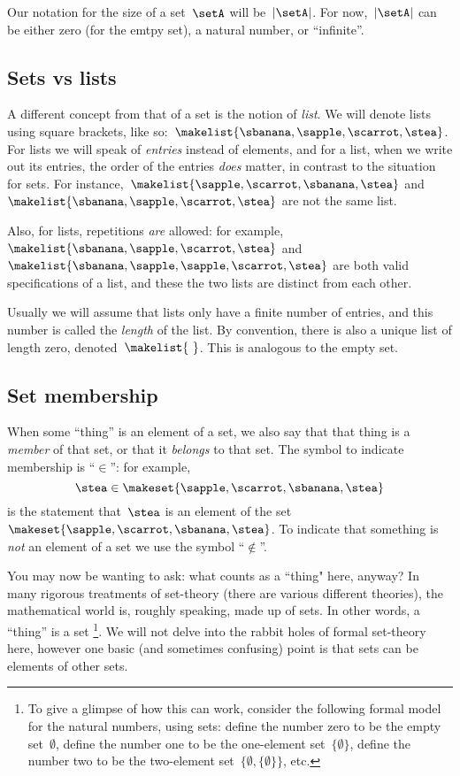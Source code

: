 Our notation for the size of a set~$\setA$ will be~$\vert \setA \vert$.
For now,~$\vert \setA \vert$ can be either zero (for the emtpy set), a natural number, or ``infinite''.
 
\subsection{Sets vs lists}

A different concept from that of a set is the notion of \emph{list}.
We will denote lists using square brackets, like so:~$\makelist{\sbanana, \sapple, \scarrot, \stea}$.
For lists we will speak of \emph{entries} instead of elements, and for a list, when we write out its entries, the order of the entries \emph{does} matter, in contrast to the situation for sets.
For instance,~$\makelist{\sapple, \scarrot, \sbanana, \stea}$ and~$\makelist{\sbanana, \sapple, \scarrot, \stea}$ are not the same list.

Also, for lists, repetitions \emph{are} allowed: for example,~$\makelist{\sbanana, \sapple, \scarrot, \stea}$ and~$\makelist{\sbanana, \sapple, \sapple, \scarrot, \stea}$ are both valid specifications of a list, and these the two lists are distinct from each other.

Usually we will assume that lists only have a finite number of entries, and this number is called the \emph{length} of the list.
By convention, there is also a unique list of length zero, denoted~$\makelist{\ }$.
This is analogous to the empty set.
 
\subsection{Set membership}

When some ``thing'' is an element of a set, we also say that that thing is a \emph{member} of that set, or that it \emph{belongs} to that set.
The symbol to indicate membership is ``$\in$'': for example,
\begin{equation*}
    \stea \in \makeset{ \sapple, \scarrot, \sbanana, \stea }
\end{equation*}
is the statement that~$\stea$ is an element of the set~$\makeset{ \sapple, \scarrot, \sbanana, \stea }$.
To indicate that something is \emph{not} an element of a set we use the symbol ``$\notin$''.

You may now be wanting to ask: what counts as a ``thing" here, anyway?
In many rigorous treatments of set-theory (there are various different theories), the mathematical world is, roughly speaking, made up of sets.
In other words, a ``thing'' is a set
\footnote{To give a glimpse of how this can work, consider the following formal model for the natural numbers, using sets: define the number zero to be the empty set~$\emptyset$, define the number one to be the one-element set~$\{ \emptyset \}$, define the number two to be the two-element set~$\{ \emptyset, \{ \emptyset \} \}$, etc. }.
We will not delve into the rabbit holes of formal set-theory here, however one basic (and sometimes confusing) point is that sets can be elements of other sets.

